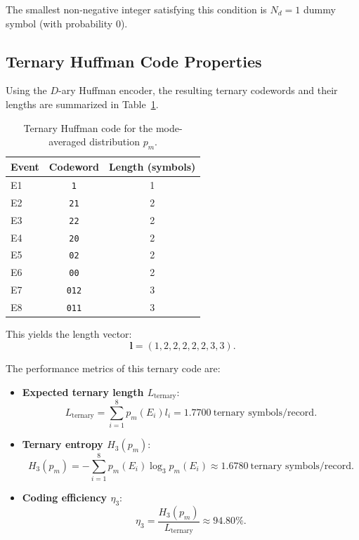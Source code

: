 \documentclass[11pt,a4paper]{article}
\begin{document}
The smallest non-negative integer satisfying this condition is \(\boxed{N_d = 1}\) dummy symbol (with probability \(0\)).

\subsection{Ternary Huffman Code Properties}

Using the \(D\)-ary Huffman encoder, the resulting ternary codewords and their lengths are summarized in Table~\ref{tab:ternary_codes}.

\begin{table}[H]
    \centering
    \caption{Ternary Huffman code for the mode-averaged distribution \(p_m\).}
    \label{tab:ternary_codes}
    \begin{tabular}{lcc}
        \toprule
        \textbf{Event} & \textbf{Codeword} & \textbf{Length (symbols)} \\
        \midrule
        E1 & \texttt{1}   & 1 \\
        E2 & \texttt{21}  & 2 \\
        E3 & \texttt{22}  & 2 \\
        E4 & \texttt{20}  & 2 \\
        E5 & \texttt{02}  & 2 \\
        E6 & \texttt{00}  & 2 \\
        E7 & \texttt{012} & 3 \\
        E8 & \texttt{011} & 3 \\
        \bottomrule
    \end{tabular}
\end{table}

This yields the length vector:
\begin{equation}
    \mathbf{l} = (1, 2, 2, 2, 2, 2, 3, 3).
\end{equation}

The performance metrics of this ternary code are:
\begin{itemize}
    \item \textbf{Expected ternary length \(L_{\mathrm{ternary}}\)}:
    \begin{equation}
        L_{\mathrm{ternary}} = \sum_{i=1}^{8} p_m(E_i) l_i = \boxed{1.7700\ \text{ternary symbols/record}}.
    \end{equation}
    \item \textbf{Ternary entropy \(H_3(p_m)\)}:
    \begin{equation}
        H_3(p_m) = -\sum_{i=1}^{8} p_m(E_i) \log_3 p_m(E_i) \approx \boxed{1.6780\ \text{ternary symbols/record}}.
    \end{equation}
    \item \textbf{Coding efficiency \(\eta_3\)}:
    \begin{equation}
        \eta_3 = \frac{H_3(p_m)}{L_{\mathrm{ternary}}} \approx \boxed{94.80\%}.
    \end{equation}
\end{itemize}
\end{document}
